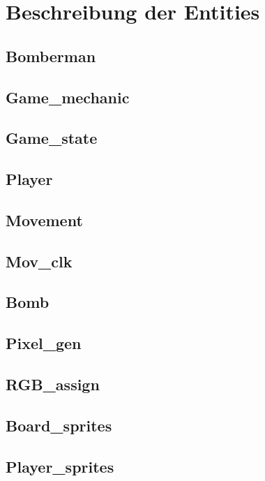 \documentclass[parskip=full]{scrartcl}
\begin{document}
	\section{Beschreibung der Entities}
		\subsection{Bomberman}
		
		\subsection{Game\_mechanic}
		
		\subsection{Game\_state}
		
		\subsection{Player}
		
		\subsection{Movement}
		
		\subsection{Mov\_clk}
		
		\subsection{Bomb}
		
		\subsection{Pixel\_gen}
		
		\subsection{RGB\_assign}
		
		\subsection{Board\_sprites}
		
		\subsection{Player\_sprites}
		
\end{document}

